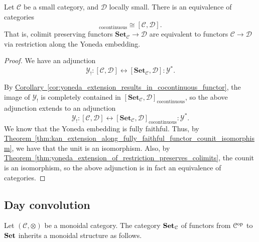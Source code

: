 \documentclass[main.tex]{subfiles}
\begin{document}
\begin{corollary}
  \label{cor:functors_equivalent_to_cocontinuous_functors_out_of_presheafs}
  Let $\mathcal{C}$ be a small category, and $\mathcal{D}$ locally small. There is an equivalence of categories
  \begin{equation*}
    [\mathbf{Set}_{\mathcal{C}} , \mathcal{D}]_{\mathrm{cocontinuous}} \cong [\mathcal{C}, \mathcal{D}].
  \end{equation*}
  That is, colimit preserving functors $\mathbf{Set}_{\mathcal{C}}  \to \mathcal{D}$ are equivalent to functors $\mathcal{C} \to \mathcal{D}$ via restriction along the Yoneda embedding.
\end{corollary}
\begin{proof}
  We have an adjunction
  \begin{equation*}
    \mathcal{Y}_{!}: [\mathcal{C}, \mathcal{D}] \leftrightarrow [\mathbf{Set}_{\mathcal{C}} , \mathcal{D}] : \mathcal{Y}^{*}.
  \end{equation*}

  By \hyperref[cor:yoneda_extension_results_in_cocontinuous_functor]{Corollary~\ref*{cor:yoneda_extension_results_in_cocontinuous_functor}}, the image of $\mathcal{Y}_{!}$ is completely contained in $[\mathbf{Set}_{\mathcal{C}} , \mathcal{D}]_{\mathrm{cocontinuous}}$, so the above adjunction extends to an adjunction
  \begin{equation*}
    \mathcal{Y}_{!}: [\mathcal{C}, \mathcal{D}] \leftrightarrow [\mathbf{Set}_{\mathcal{C}} , \mathcal{D}]_{\mathrm{cocontinuous}} : \mathcal{Y}^{*}.
  \end{equation*}
  We know that the Yoneda embedding is fully faithful. Thus, by \hyperref[thm:kan_extension_along_fully_faithful_functor_counit_isomorphism]{Theorem~\ref*{thm:kan_extension_along_fully_faithful_functor_counit_isomorphism}}, we have that the unit is an isomorphism. Also, by \hyperref[thm:yoneda_extension_of_restriction_preserves_colimits]{Theorem~\ref*{thm:yoneda_extension_of_restriction_preserves_colimits}}, the counit is an isomorphism, so the above adjunction is in fact an equivalence of categories.
\end{proof}

\subsection{Day convolution}
\label{ssc:day_convolution}

Let $(\mathcal{C}, \otimes)$ be a monoidal category. The category $\mathbf{Set}_{\mathcal{C}}$ of functors from $\mathcal{C}^{\mathrm{op}}$ to $\mathbf{Set}$ inherits a monoidal structure as follows.
\end{document}
